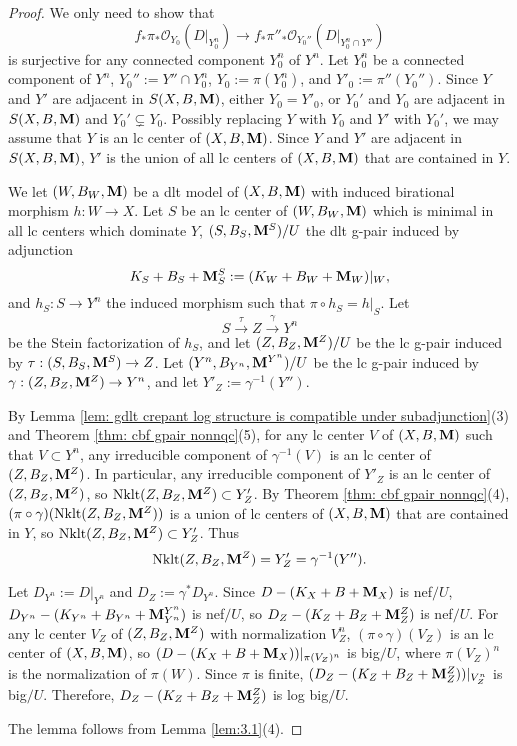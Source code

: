 \documentclass[11pt]{amsart}
\numberwithin{equation}{section}
\newcommand{\Mm}{{\bf{M}}}
\newcommand{\Nklt}{\operatorname{Nklt}}
\theoremstyle{definition}
\theoremstyle{definition}
\theoremstyle{definition}
\begin{document}
\begin{proof}
We only need to show that
$$f_*\pi_*\mathcal{O}_{Y_0}(D|_{Y^n_0}) \rightarrow f_*\pi''_*\mathcal{O}_{Y_0''}(D|_{Y^n_0\cap Y''})$$
is surjective for any connected component $Y^n_0$ of $Y^n$. Let $Y^n_0$ be a connected component of $Y^n$, $Y_0'':=Y''\cap Y^n_0$, $Y_0:=\pi(Y^n_0)$, and $Y'_0:=\pi''(Y_0'')$. Since $Y$ and $Y'$ are adjacent in $S(X,B,\Mm)$, either $Y_0=Y'_0$, or $Y_0'$ and $Y_0$ are adjacent in $S(X,B,\Mm)$ and $Y_0'\subsetneq Y_0$. Possibly replacing $Y$ with $Y_0$ and $Y'$ with $Y_0'$, we may assume that $Y$ is an lc center of $(X,B,\Mm)$. Since  $Y$ and $Y'$ are adjacent in $S(X,B,\Mm)$, $Y'$ is the union of all lc centers of $(X,B,\Mm)$ that are contained in $Y$.

We let $(W,B_W,\Mm)$ be a dlt model of $(X,B,\Mm)$ with induced birational morphism $h: W\rightarrow X$. Let $S$ be an lc center of $(W,B_W,\Mm)$ which is minimal in all lc centers which dominate $Y$, $(S,B_S,\Mm^S)/U$ the dlt g-pair induced by adjunction 
$$K_S+B_S+\Mm^S_S:=(K_W+B_W+\Mm_W)|_W,$$
and $h_S: S\rightarrow Y^n$ the induced morphism such that $\pi\circ h_S=h|_S$. Let
$$S\xrightarrow{\tau} Z\xrightarrow{\gamma} Y^n$$
be the Stein factorization of $h_S$, and let $(Z,B_Z,\Mm^Z)/U$ be the lc g-pair induced by $\tau: (S,B_S,\Mm^S)\rightarrow Z$. Let $(Y^n,B_{Y^n},\Mm^{Y^n})/U$ be the lc g-pair induced by $\gamma: (Z,B_Z,\Mm^Z)\rightarrow Y^n$, and let $Y'_Z:=\gamma^{-1}(Y'')$.

 By Lemma \ref{lem: gdlt crepant log structure is compatible under subadjunction}(3) and Theorem \ref{thm: cbf gpair nonnqc}(5), for any lc center $V$ of $(X,B,\Mm)$ such that $V\subset Y^n$, any irreducible component of $\gamma^{-1}(V)$ is an lc center of $(Z,B_Z,\Mm^Z)$. In particular, any irreducible component of $Y'_Z$ is an lc center of $(Z,B_Z,\Mm^Z)$, so $\Nklt(Z,B_Z,\Mm^Z)\subset Y'_Z$. By Theorem \ref{thm: cbf gpair nonnqc}(4), $(\pi\circ\gamma)(\Nklt(Z,B_Z,\Mm^Z))$ is a union of lc centers of $(X,B,\Mm)$ that are contained in $Y$, so $\Nklt(Z,B_Z,\Mm^Z)\subset Y'_Z$. Thus  $$\Nklt(Z,B_Z,\Mm^Z)=Y'_Z=\gamma^{-1}(Y'').$$

Let $D_{Y^n}:=D|_{Y^n}$ and $D_Z:=\gamma^*D_{Y^n}$. Since $D-(K_X+B+\Mm_X)$ is nef$/U$, $D_{Y^n}-(K_{Y^n}+B_{Y^n}+\Mm^{Y^n}_{Y^n})$ is nef$/U$, so $D_Z-(K_Z+B_Z+\Mm^Z_Z)$ is nef$/U$. For any lc center $V_Z$ of $(Z,B_Z,\Mm^Z)$ with normalization $V_Z^n$, $(\pi\circ\gamma)(V_Z)$ is an lc center of $(X,B,\Mm)$, so  $(D-(K_X+B+\Mm_X))|_{\pi(V_Z)^n}$ is big$/U$, where $\pi(V_Z)^n$ is the normalization of $\pi(W)$. Since $\pi$ is finite, $(D_Z-(K_Z+B_Z+\Mm^Z_Z))|_{V_Z^n}$ is big$/U$. Therefore, $D_Z-(K_Z+B_Z+\Mm^Z_Z)$ is log big$/U$.

The lemma follows from Lemma \ref{lem:3.1}(4).
\end{proof}
\end{document}
